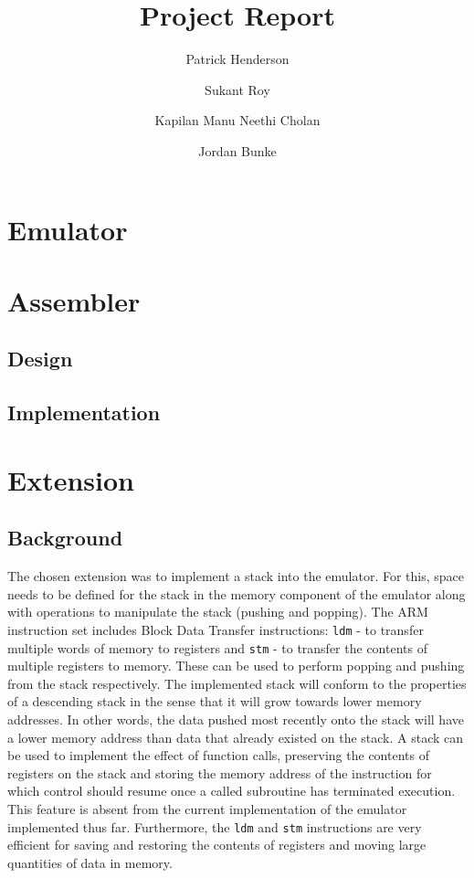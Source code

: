 \documentclass[11pt]{article}
\begin{document}
\title{Project Report}
\author{Patrick Henderson\\
	\and
	Sukant Roy\\
	\and 
	Kapilan Manu Neethi Cholan\\
	\and 
	Jordan Bunke
}

\maketitle

\section{Emulator}

\section{Assembler}

\subsection{Design}

\subsection{Implementation}

\section{Extension}

\subsection{Background}

The chosen extension was to implement a stack into the emulator. For this, space needs to be defined for the stack in the memory component of the emulator along with operations to manipulate the stack (pushing and popping). The ARM instruction set includes Block Data Transfer instructions: \texttt{ldm} - to transfer multiple words of memory to registers and \texttt{stm} - to transfer the contents of multiple registers to memory. These can be used to perform popping and pushing from the stack respectively.\newline
\indent The implemented stack will conform to the properties of a descending stack in the sense that it will grow towards lower memory addresses. In other words, the data pushed most recently onto the stack will have a lower memory address than data that already existed on the stack.\newline
\indent A stack can be used to implement the effect of function calls, preserving the contents of registers on the stack and storing the memory address of the instruction for which control should resume once a called subroutine has terminated execution. This feature is absent from the current implementation of the emulator implemented thus far. Furthermore, the \texttt{ldm} and \texttt{stm} instructions are very efficient for saving and restoring the contents of registers and moving large quantities of data in memory.
\end{document}
